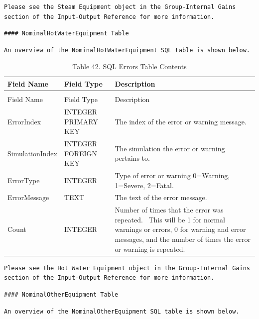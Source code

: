 \begin{lstlisting}
Please see the Steam Equipment object in the Group-Internal Gains section of the Input-Output Reference for more information.
\end{lstlisting}

\begin{lstlisting}
#### NominalHotWaterEquipment Table
\end{lstlisting}

\begin{lstlisting}
An overview of the NominalHotWaterEquipment SQL table is shown below.
\end{lstlisting}

\begin{longtable}[c]{p{1.5in}p{1.5in}p{2.99in}}
\caption{Table 42. SQL Errors Table Contents \label{table:table-42.-sql-errors-table-contents}} \tabularnewline
\toprule 
Field Name & Field Type & Description \tabularnewline
\midrule
\endfirsthead

\caption[]{Table 42. SQL Errors Table Contents} \tabularnewline
\toprule 
Field Name & Field Type & Description \tabularnewline
\midrule
\endhead

ErrorIndex & INTEGER PRIMARY KEY & The index of the error or warning message. \tabularnewline
SimulationIndex & INTEGER FOREIGN KEY & The simulation the error or warning pertains to. \tabularnewline
ErrorType & INTEGER & Type of error or warning 0=Warning, 1=Severe, 2=Fatal. \tabularnewline
ErrorMessage & TEXT & The text of the error message. \tabularnewline
Count & INTEGER & Number of times that the error was repeated.~ This will be 1 for normal warnings or errors, 0 for warning and error messages, and the number of times the error or warning is repeated. \tabularnewline
\bottomrule
\end{longtable}

\begin{lstlisting}
Please see the Hot Water Equipment object in the Group-Internal Gains section of the Input-Output Reference for more information.
\end{lstlisting}

\begin{lstlisting}
#### NominalOtherEquipment Table
\end{lstlisting}

\begin{lstlisting}
An overview of the NominalOtherEquipment SQL table is shown below.
\end{lstlisting}

